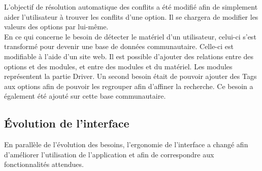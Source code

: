 \documentclass[16pts]{report}
\begin{document}
L'objectif de résolution automatique des conflits a été modifié afin de 
simplement aider l'utilisateur à trouver les conflits d'une option. Il se 
chargera de modifier les valeurs des options par lui-même.
\\

En ce qui concerne le besoin de détecter le matériel d'un utilisateur, celui-ci 
s'est transformé pour devenir une base de données communautaire. Celle-ci est 
modifiable à l'aide d'un site web. Il est possible d'ajouter des relations 
entre des options et des modules, et entre des modules et du matériel. Les 
modules représentent la partie Driver. Un second besoin était de pouvoir 
ajouter des Tags aux options afin de pouvoir les regrouper afin d'affiner la 
recherche. Ce besoin a également été ajouté sur cette base communautaire.

        \subsection{Évolution de l'interface}
        \label{sub:Évolution de l'interface}

En parallèle de l'évolution des besoins, l'ergonomie de l'interface a changé 
afin d'améliorer l'utilisation de l'application et afin de correspondre aux 
fonctionnalités attendues.
\end{document}
